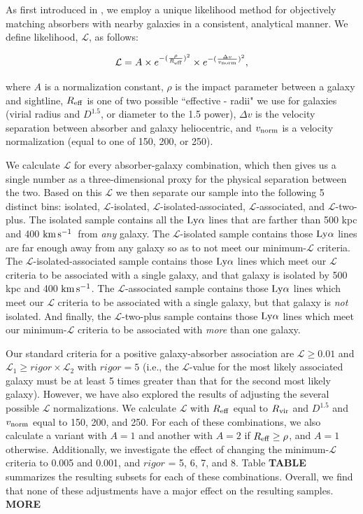 \documentclass[twocolumn,tighten]{aastex62}
\newcommand{\kms}{$\rm km\, s^{-1}$}
\begin{document}
As first introduced in \cite{french2017}, we employ a unique likelihood method for objectively matching absorbers with nearby galaxies in a consistent, analytical manner. We define likelihood, $\mathcal{L}$, as follows: 

\begin{equation}
\mathcal{L} = A \times e^{-(\frac{\rho}{R_{\rm eff}})^2} \times e^{-(\frac{\Delta v}{v_{\rm norm}})^2},
\label{likelihood}
\end{equation}

\noindent where $A$ is a normalization constant, $\rho$ is the impact parameter between a galaxy and sightline, $R_{\rm eff}$ is one of two possible ``effective - radii" we use for galaxies (virial radius and $D^{1.5}$, or diameter to the 1.5 power), $\Delta v$ is the velocity separation between absorber and galaxy heliocentric, and $v_{\rm norm}$ is a velocity normalization (equal to one of 150, 200, or 250). 

We calculate $\mathcal{L}$ for every absorber-galaxy combination, which then gives us a single number as a three-dimensional proxy for the physical separation between the two. Based on this $\mathcal{L}$ we then separate our sample into the following 5 distinct bins: isolated, $\mathcal{L}$-isolated, $\mathcal{L}$-isolated-associated, $\mathcal{L}$-associated, and $\mathcal{L}$-two-plus. The isolated sample contains all the $\rm Ly\alpha$ lines that are farther than 500 kpc and 400 \kms~from \emph{any} galaxy. The $\mathcal{L}$-isolated sample contains those $\rm Ly\alpha$ lines are far enough away from any galaxy so as to not meet our minimum-$\mathcal{L}$ criteria. The $\mathcal{L}$-isolated-associated sample contains those $\rm Ly\alpha$ lines which meet our $\mathcal{L}$ criteria to be associated with a single galaxy, and that galaxy is isolated by 500 kpc and 400 \kms. The $\mathcal{L}$-associated sample contains those $\rm Ly\alpha$ lines which meet our $\mathcal{L}$ criteria to be associated with a single galaxy, but that galaxy is \emph{not} isolated. And finally, the 
$\mathcal{L}$-two-plus sample contains those  $\rm Ly\alpha$ lines which meet our minimum-$\mathcal{L}$ criteria to be associated with \emph{more} than one galaxy.

Our standard criteria for a positive galaxy-absorber association are $\mathcal{L} \geq 0.01$ and $\mathcal{L}_1 \geq rigor \times \mathcal{L}_2$ with $rigor =5$ (i.e., the $\mathcal{L}$-value for the most likely associated galaxy must be at least 5 times greater than that for the second most likely galaxy). However, we have also explored the results of adjusting the several possible $\mathcal{L}$ normalizations. We calculate $\mathcal{L}$ with $R_{\rm eff}$ equal to $R_{\rm vir}$ and $D^{1.5}$ and $v_{\rm norm}$ equal to 150, 200, and 250. For each of these combinations, we also calculate a variant with $A =1$ and another with $A = 2$ if $R_{\rm eff} \ge \rho$, and $A=1$ otherwise. Additionally, we investigate the effect of changing the minimum-$\mathcal{L}$ criteria to 0.005 and 0.001, and $rigor$ = 5, 6, 7, and 8. Table \textbf{TABLE} summarizes the resulting subsets for each of these combinations. Overall, we find that none of these adjustments have a major effect on the resulting samples. \textbf{MORE}
\end{document}
